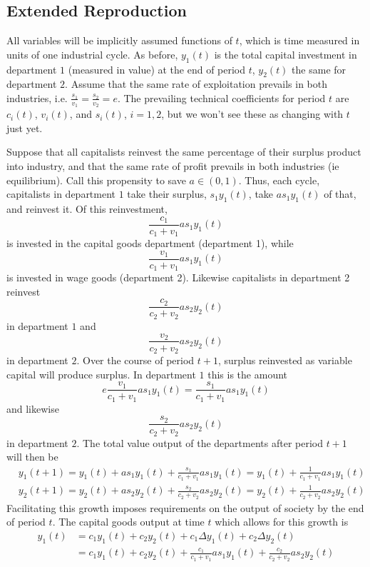 \documentclass{article}
\theoremstyle{definition}
\theoremstyle{plain}
\theoremstyle{theorem}
\begin{document}
\subsection{Extended Reproduction}
All variables will be implicitly assumed functions of $t$, which is time measured in units of one industrial cycle. As before, $y_1(t)$ is the total capital investment in department $1$ (measured in value) at the end of period $t$, $y_2(t)$ the same for department $2$. Assume that the same rate of exploitation prevails in both industries, i.e. $\frac{s_1}{v_1} = \frac{s_2}{v_2} = e$. The prevailing technical coefficients for period $t$ are $c_i(t)$, $v_i(t)$, and $s_i(t)$, $i=1,2$, but we won't see these as changing with $t$ just yet. \par 
 Suppose that all capitalists reinvest the same percentage of their surplus product into industry, and that the same rate of profit prevails in both industries (ie equilibrium). Call this propensity to save $a \in (0,1)$. Thus, each cycle, capitalists in department $1$ take their surplus, $s_1y_1(t)$, take $as_1y_1(t)$ of that, and reinvest it. Of this reinvestment, 
\[  \frac{c_1}{c_1+v_1}as_1y_1(t) \] 
is invested in the capital goods department (department 1), while 
\[ \frac{v_1}{c_1+v_1}as_1y_1(t) \]
is invested in wage goods (department 2). Likewise capitalists in department 2 reinvest 
\[\frac{c_2}{c_2+v_2}as_2y_2(t) \] in department $1$ and 
\[\frac{v_2}{c_2+v_2}as_2y_2(t) \]
 in department $2$. Over the course of period $t+1$, surplus reinvested as variable capital will produce surplus. In department $1$ this is the amount 
 \[ e\frac{v_1}{c_1+v_1}as_1y_1(t) = \frac{s_1}{c_1+v_1}as_1y_1(t) \]
and likewise
\[ \frac{s_2}{c_2+v_2}as_2y_2(t) \]
in department $2$. The total value output of the departments after period $t+1$ will then be
\begin{align}
	& y_1(t+1) = y_1(t) + as_1y_1(t) + \frac{s_1}{c_1+v_1}as_1y_1(t) = y_1(t) + \frac{1}{c_1+v_1}as_1y_1(t) \\
	& y_2(t+1) = y_2(t) + as_2y_2(t) + \frac{s_2}{c_2+v_2}as_2y_2(t) = y_2(t) + \frac{1}{c_2+v_2}as_2y_2(t)
\end{align}
Facilitating this growth imposes requirements on the output of society by the end of period $t$. The capital goods output at time $t$ which allows for this growth is 
\begin{align}
	 y_1(t) &= c_1y_1(t) + c_2y_2(t) + c_1\Delta y_1(t) + c_2 \Delta y_2(t) \\
	 		&= c_1y_1(t) + c_2y_2(t) + \frac{c_1}{c_1+v_1}as_1y_1(t) + \frac{c_2}{c_2+v_2}as_2y_2(t)
\end{align}
\end{document}
